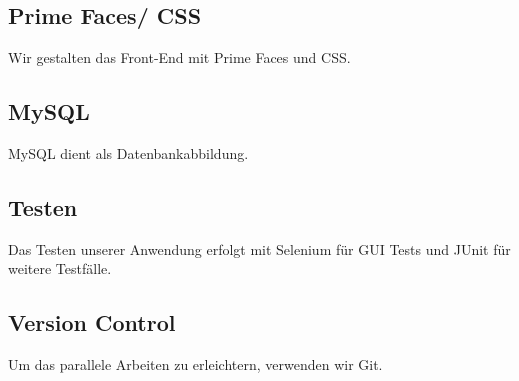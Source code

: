 \subsection{Prime Faces/ CSS}
Wir gestalten das Front-End mit Prime Faces und CSS.

\subsection{MySQL}
MySQL dient als Datenbankabbildung.

\subsection{Testen}
Das Testen unserer Anwendung erfolgt mit Selenium für GUI Tests und JUnit für weitere Testfälle.

\subsection{Version Control}
Um das parallele Arbeiten zu erleichtern, verwenden wir Git.